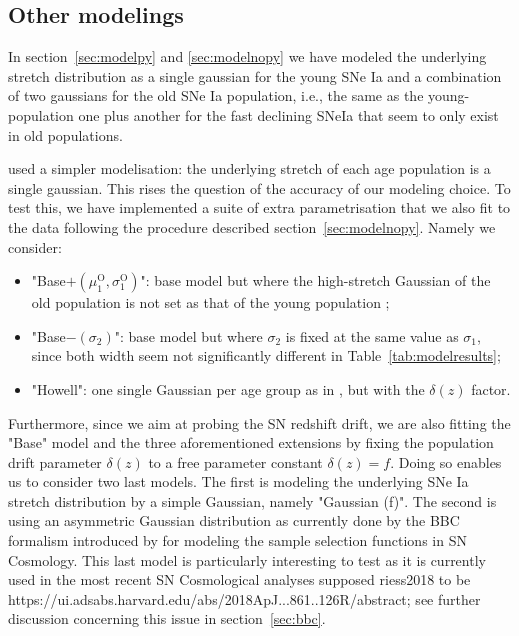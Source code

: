 \documentclass[]{aa} %
\newcommand{\nn}[1]{{\textcolor[rgb]{1, 0.27, 0}{#1}}}
\begin{document}
\subsection{Other modelings}
\label{sec:othermodel}

In section~\ref{sec:modelpy} and \ref{sec:modelnopy} we have modeled the
underlying stretch distribution as a single gaussian for the young SNe Ia and a
combination of two gaussians for the old SNe Ia population, i.e., the same as
the young-population one plus another for the fast declining SNeIa that seem to
only exist in old populations.

\cite{howell2007} used a simpler modelisation: the underlying stretch of each
age population is a single gaussian. This rises the question of the accuracy of
our modeling choice. To test this, we have implemented a suite of extra
parametrisation that we also fit to the data following the procedure described
section~\ref{sec:modelnopy}. Namely we consider:
\begin{itemize}

    \item "Base$+(\mu_1^{\mathrm{O}}, \sigma_1^{\mathrm{O}})$": base model but
        where the high-stretch Gaussian of the old population is not set as that
        of the young population ;

    \item "Base$-(\sigma_2)$": base model but where $\sigma_2$ is fixed at the
        same value as $\sigma_1$, since both width seem not significantly
        different in Table~\ref{tab:modelresults};

    \item "Howell": one single Gaussian per age group as in \citep{howell2007},
        but with the $\delta(z)$ factor.

\end{itemize}

Furthermore, since we aim at probing the SN redshift drift, we are also fitting
the "Base" model and the three aforementioned extensions by fixing the
population drift parameter $\delta(z)$ to a free parameter constant
$\delta(z)=f$. Doing so enables us to consider two last models. The first is
modeling the underlying SNe Ia stretch distribution by a simple Gaussian, namely
"Gaussian (f)". The second is using an asymmetric Gaussian distribution as
currently done by the BBC formalism introduced by \cite{kessler2017,
scolnic2018b} for modeling the sample selection functions in SN Cosmology. This
last model is particularly interesting to test as it is currently used in the
most recent SN Cosmological analyses \cite{riess2016, riess2018, PSpaper,
scolnic2018a, DESpaper} \nn{supposed riess2018 to be
https://ui.adsabs.harvard.edu/abs/2018ApJ...861..126R/abstract}; see further
discussion concerning this issue in section~\ref{sec:bbc}.
\end{document}
